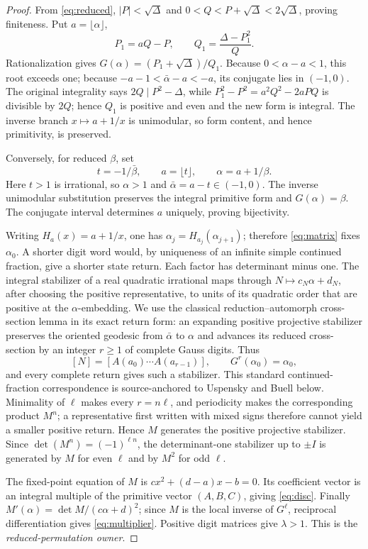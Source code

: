\documentclass[10pt]{article}
\begin{document}
\begin{proof}
From \eqref{eq:reduced},
\(|P|<\sqrt\Delta\) and \(0<Q<P+\sqrt\Delta<2\sqrt\Delta\), proving
finiteness.  Put \(a=\lfloor\alpha\rfloor\),
\begin{equation}\label{eq:update}
 P_1=aQ-P,\qquad Q_1=\frac{\Delta-P_1^2}{Q}.
\end{equation}
Rationalization gives
\(G(\alpha)=(P_1+\sqrt\Delta)/Q_1\).  Because
\(0<\alpha-a<1\), this root exceeds one; because
\(-a-1<\bar\alpha-a<-a\), its conjugate lies in \((-1,0)\).
The original integrality says \(2Q\mid P^2-\Delta\), while
\(P_1^2-P^2=a^2Q^2-2aPQ\) is divisible by \(2Q\); hence \(Q_1\) is positive
and even and the new form is integral.  The inverse branch
\(x\mapsto a+1/x\) is unimodular, so form content, and hence primitivity, is
preserved.

Conversely, for reduced \(\beta\), set
\begin{equation}\label{eq:predecessor}
 t=-1/\bar\beta,\qquad a=\lfloor t\rfloor,\qquad
 \alpha=a+1/\beta.
\end{equation}
Here \(t>1\) is irrational, so \(\alpha>1\) and
\(\bar\alpha=a-t\in(-1,0)\).  The inverse unimodular substitution preserves
the integral primitive form and \(G(\alpha)=\beta\).  The conjugate interval
determines \(a\) uniquely, proving bijectivity.

Writing \(H_a(x)=a+1/x\), one has
\(\alpha_j=H_{a_j}(\alpha_{j+1})\); therefore \eqref{eq:matrix} fixes
\(\alpha_0\).  A shorter digit word would, by uniqueness of an infinite
simple continued fraction, give a shorter state return.  Each factor has
determinant minus one.  The integral stabilizer of a real quadratic irrational
maps through \(N\mapsto c_N\alpha+d_N\), after choosing the positive
representative, to units of its quadratic order that are positive at the
\(\alpha\)-embedding.  We use the classical
reduction--automorph cross-section lemma in its exact return form: an expanding
positive projective stabilizer preserves the oriented geodesic from
\(\bar\alpha\) to \(\alpha\) and advances its reduced cross-section by an
integer \(r\geq1\) of complete Gauss digits.  Thus
\[
 [N]=[A(a_0)\cdots A(a_{r-1})],\qquad G^r(\alpha_0)=\alpha_0,
\]
and every complete return gives such a stabilizer.  This standard
continued-fraction correspondence is source-anchored to Uspensky and Buell
below.  Minimality of \(\ell\) makes every \(r=n\ell\), and periodicity makes
the corresponding product \(M^n\); a representative first written with mixed
signs therefore cannot yield a smaller positive return.  Hence \(M\)
generates the positive projective stabilizer.  Since
\(\det(M^n)=(-1)^{\ell n}\), the determinant-one stabilizer up to \(\pm I\)
is generated by \(M\) for even \(\ell\) and by \(M^2\) for odd \(\ell\).

The fixed-point equation of \(M\) is
\(cx^2+(d-a)x-b=0\).  Its coefficient vector is an integral multiple of the
primitive vector \((A,B,C)\), giving \eqref{eq:disc}.  Finally
\(M'(\alpha)=\det M/(c\alpha+d)^2\); since \(M\) is the local inverse of
\(G^\ell\), reciprocal differentiation gives \eqref{eq:multiplier}.  Positive
digit matrices give \(\lambda>1\).  This is the \emph{reduced-permutation
owner}.
\end{proof}
\end{document}
